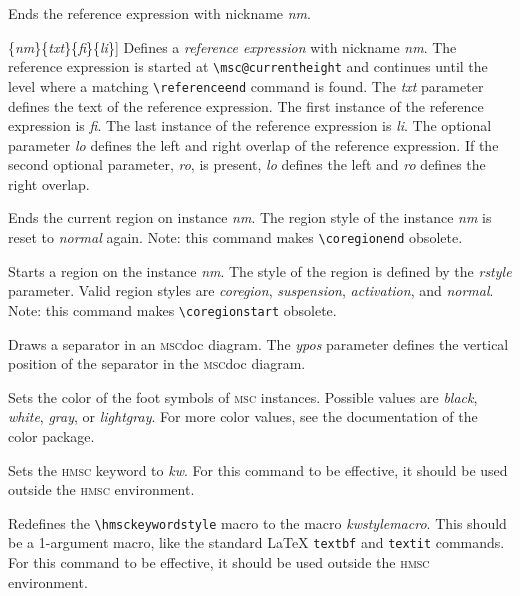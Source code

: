 \documentclass[a4paper]{article}
\newcommand{\cmd}[1]{\texttt{\bslash #1}}
\newcommand{\acro}[1]{{\scshape\lowercase{#1}}}
\newcommand\MSC{\acro{MSC}}
\newcommand\HMSC{\acro{HMSC}}
\newcommand{\MSCdoc}{\MSC{}doc}
\newcommand{\opt}[1]{[#1]}
\newcommand{\cmdarg}[1]{\{\emph{#1}\}}
\newcommand{\coordarg}[1]{\emph{#1}}
\newenvironment{defs}{%
  \begin{list}{}%
              {\setlength{\labelwidth}{0pt}%
               \setlength{\labelsep}{1em}%
               \setlength{\leftmargin}{1em}%
               \setlength{\parsep}{1ex}%
               \setlength{\listparindent}{0pt}%
               \setlength{\rightmargin}{0pt}%
               \renewcommand{\makelabel}[1]{##1}%
               \raggedright%
              }%
  }{%
  \end{list}}
\begin{document}
\begin{defs}
\item[\cmd{referenceend}\{\emph{nm}\}] Ends the reference expression with
nickname \emph{nm}.

\item[\cmd{referencestart}\opt{\emph{lo}}\opt{\emph{ro}}\{\emph{nm}\}\{\emph{txt}\}\{\emph{fi}\}\{\emph{li}\}]
Defines a \emph{reference expression} with nickname \emph{nm}. The
reference expression is started at \verb|\msc@currentheight| and
continues until the level where a matching \verb|\referenceend| command
is found.  The \emph{txt} parameter defines the text of the reference
expression.  The first instance of the reference expression is
\emph{fi}. The last instance of the reference expression is
\emph{li}. The optional parameter \emph{lo} defines the left and right
overlap of the reference expression. If the second optional parameter,
\emph{ro}, is present, \emph{lo} defines the left and \emph{ro}
defines the right overlap.

\item[\cmd{regionend}\{\emph{nm}\}] Ends the current region on
instance \emph{nm}. The region style of the instance \emph{nm} is
reset to \emph{normal} again. Note: this command makes
\verb|\coregionend| obsolete.

\item[\cmd{regionstart}\{\emph{rstyle}\}\{\emph{nm}\}] Starts a region
on the instance \emph{nm}. The style of the region is defined by the
\emph{rstyle} parameter. Valid region styles are \emph{coregion},
\emph{suspension}, \emph{activation}, and \emph{normal}. Note: this
command makes \verb|\coregionstart| obsolete.

\item[\cmd{separator}\cmdarg{ypos}] Draws a separator in an \MSCdoc{}
diagram. The \coordarg{ypos} parameter defines the vertical position of the
separator in the \MSCdoc{} diagram.

\item[\cmd{setfootcolor}\{\emph{color}\}] Sets the color of the foot symbols of
\MSC{} instances. Possible values are \emph{black}, \emph{white},
\emph{gray}, or \emph{lightgray}. For more color values, see the
documentation of the \LaTeXe{} \textsf{color} package.

\item[\cmd{sethmsckeyword}\{\emph{kw}\}] Sets the \HMSC{} keyword to
\emph{kw}. For this command to be effective, it should be used outside
the \HMSC{} environment.

\item[\cmd{sethmsckeywordstyle}\{\emph{kwstylemacro}\}] Redefines the
\verb|\hmsckeywordstyle| macro to the macro \emph{kwstylemacro}. This
should be a 1-argument macro, like the standard \LaTeX{}
\cmd{textbf} and \cmd{textit}  commands. For this command to be effective, it
should be used outside the \HMSC{} environment.


\end{defs}
\end{document}
